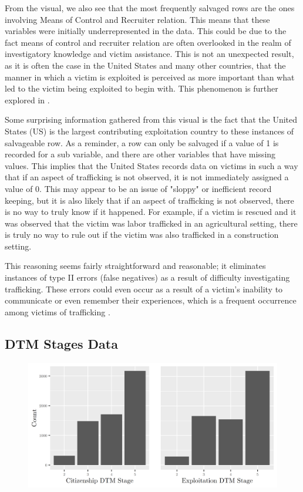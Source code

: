 \documentclass{article} %
\begin{document}
From the visual, we also see that the most frequently salvaged rows are the ones involving Means of Control and Recruiter relation. This means that these variables were initially underrepresented in the data. This could be due to the fact means of control and recruiter relation are often overlooked in the realm of investigatory knowledge and victim assistance. This is not an unexpected result, as it is often the case in the United States and many other countries, that the manner in which a victim is exploited is perceived as more important than what led to the victim being exploited to begin with. This phenomenon is further explored in \cite{MediaRep}.

Some surprising information gathered from this visual is the fact that the United States (US) is the largest contributing exploitation country to these instances of salvageable row. As a reminder, a row can only be salvaged if a value of 1 is recorded for a sub variable, and there are other variables that have missing values. This implies that the United States records data on victims in such a way that if an aspect of trafficking is not observed, it is not immediately assigned a value of 0. This may appear to be an issue of "sloppy" or inefficient record keeping, but it is also likely that if an aspect of trafficking is not observed, there is no way to truly know if it happened. For example, if a victim is rescued and it was observed that the victim was labor trafficked in an agricultural setting, there is truly no way to rule out if the victim was also trafficked in a construction setting. 

This reasoning seems fairly straightforward and reasonable; it eliminates instances of type II errors (false negatives) as a result of difficulty investigating trafficking. These errors could even occur as a result of a victim's inability to communicate or even remember their experiences, which is a frequent occurrence among victims of trafficking \parencite{PTSD}. 




\subsection{DTM Stages Data}

\FloatBarrier
\begin{figure}[H]
	\includegraphics[width=\textwidth]{DTMStagesBarplot}
\end{figure}
\FloatBarrier
\end{document}
